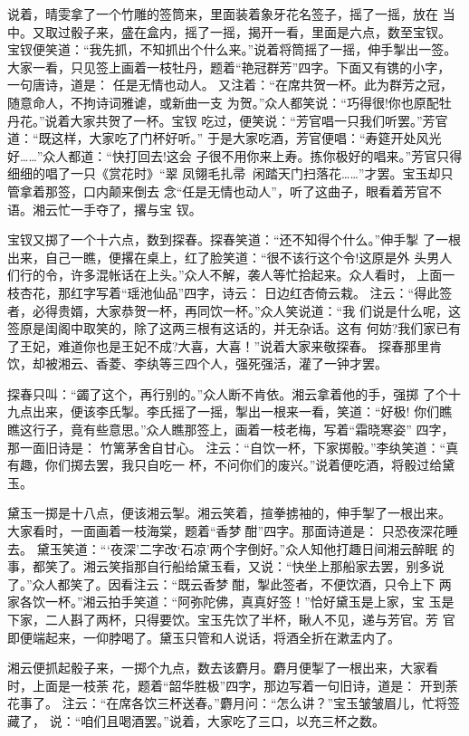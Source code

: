 说着，晴雯拿了一个竹雕的签筒来，里面装着象牙花名签子，摇了一摇，放在
当中。又取过骰子来，盛在盒内，摇了一摇，揭开一看，里面是六点，数至宝钗。
宝钗便笑道：“我先抓，不知抓出个什么来。”说着将筒摇了一摇，伸手掣出一签。
大家一看，只见签上画着一枝牡丹，题着“艳冠群芳”四字。下面又有镌的小字，
一句唐诗，道是：
任是无情也动人。
又注着：“在席共贺一杯。此为群芳之冠，随意命人，不拘诗词雅谑，或新曲一支
为贺。”众人都笑说：“巧得很!你也原配牡丹花。”说着大家共贺了一杯。宝钗
吃过，便笑说：“芳官唱一只我们听罢。”芳官道：“既这样，大家吃了门杯好听。”
于是大家吃酒，芳官便唱：“寿筵开处风光好……”众人都道：“快打回去!这会
子很不用你来上寿。拣你极好的唱来。”芳官只得细细的唱了一只《赏花时》“翠
凤翎毛扎帚，闲踏天门扫落花……”才罢。宝玉却只管拿着那签，口内颠来倒去
念“任是无情也动人”，听了这曲子，眼看着芳官不语。湘云忙一手夺了，撂与宝
钗。

宝钗又掷了一个十六点，数到探春。探春笑道：“还不知得个什么。”伸手掣
了一根出来，自己一瞧，便撂在桌上，红了脸笑道：“很不该行这个令!这原是外
头男人们行的令，许多混帐话在上头。”众人不解，袭人等忙拾起来。众人看时，
上面一枝杏花，那红字写着“瑶池仙品”四字，诗云：
日边红杏倚云栽。
注云：“得此签者，必得贵婿，大家恭贺一杯，再同饮一杯。”众人笑说道：“我
们说是什么呢，这签原是闺阁中取笑的，除了这两三根有这话的，并无杂话。这有
何妨?我们家已有了王妃，难道你也是王妃不成?大喜，大喜！”说着大家来敬探春。
探春那里肯饮，却被湘云、香菱、李纨等三四个人，强死强活，灌了一钟才罢。

探春只叫：“蠲了这个，再行别的。”众人断不肯依。湘云拿着他的手，强掷
了个十九点出来，便该李氏掣。李氏摇了一摇，掣出一根来一看，笑道：“好极!
你们瞧瞧这行子，竟有些意思。”众人瞧那签上，画着一枝老梅，写着“霜晓寒姿”
四字，那一面旧诗是：
竹篱茅舍自甘心。
注云：“自饮一杯，下家掷骰。”李纨笑道：“真有趣，你们掷去罢，我只自吃一
杯，不问你们的废兴。”说着便吃酒，将骰过给黛玉。

黛玉一掷是十八点，便该湘云掣。湘云笑着，揎拳掳袖的，伸手掣了一根出来。
大家看时，一面画着一枝海棠，题着“香梦酣”四字。那面诗道是：
只恐夜深花睡去。
黛玉笑道：“‘夜深’二字改‘石凉’两个字倒好。”众人知他打趣日间湘云醉眠
的事，都笑了。湘云笑指那自行船给黛玉看，又说：“快坐上那船家去罢，别多说
了。”众人都笑了。因看注云：“既云香梦酣，掣此签者，不便饮酒，只令上下
两家各饮一杯。”湘云拍手笑道：“阿弥陀佛，真真好签！”恰好黛玉是上家，宝
玉是下家，二人斟了两杯，只得要饮。宝玉先饮了半杯，瞅人不见，递与芳官。芳
官即便端起来，一仰脖喝了。黛玉只管和人说话，将酒全折在漱盂内了。

湘云便抓起骰子来，一掷个九点，数去该麝月。麝月便掣了一根出来，大家看
时，上面是一枝荼花，题着“韶华胜极”四字，那边写着一句旧诗，道是：
开到荼花事了。
注云：“在席各饮三杯送春。”麝月问：“怎么讲？”宝玉皱皱眉儿，忙将签藏了，
说：“咱们且喝酒罢。”说着，大家吃了三口，以充三杯之数。

